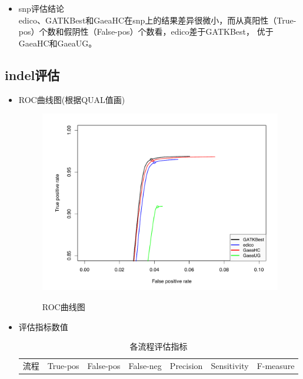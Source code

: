 \documentclass[UTF8,10pt,a4paper]{ctexart}
\begin{document}
\begin{itemize}
\begin{table}[htp]
\end{table}
\item snp评估结论 \\
	edico、GATKBest和GaeaHC在snp上的结果差异很微小，而从真阳性（True-pos）个数和假阴性（False-pos）个数看，edico差于GATKBest， 优于GaeaHC和GaeaUG。
\end{itemize}

\subsection{indel评估}
\begin{itemize}
\item ROC曲线图(根据QUAL值画)\\

\begin{figure}[htbp]
\begin{center}
\label{indel}
\includegraphics[width=15cm]{indel.pdf}
\caption{ROC曲线图}
\end{center}
\end{figure}
\item 评估指标数值\\
\begin{table}[htp]
\newcommand{\tabincell}[2]{\begin{tabular}{@{}#1@{}}#2\end{tabular}}
{\small
\caption{各流程评估指标}
\begin{center}
\begin{tabular}{p{2cm}|p{2cm}|p{2cm}|p{2cm}|p{2cm}|p{2cm}|p{2cm}}
\hline
流程 & True-pos & False-pos & False-neg & Precision & Sensitivity & F-measure\\

\end{tabular}
\end{center}}
\end{table}
\end{itemize}
\end{document}
